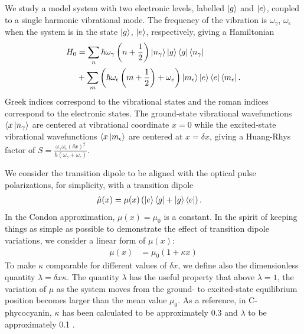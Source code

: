 We study a model system with two electronic levels, labelled $\ket{g}$ and $\ket{e}$, coupled to a single harmonic vibrational mode. The frequency of the vibration is $\omega_\gamma$, $\omega_\epsilon$ when the system is in the state $\ket{g}$, $\ket{e}$, respectively, giving a Hamiltonian
\begin{align}
	H_0 &=  \sum_n \hbar \omega_{\gamma}  \left(n + \frac{1}{2} \right)  \ket{n_{\gamma}}\ket{g}\bra{g} \bra{n_{\gamma}} \\
   &+ \sum_m \left(  \hbar \omega_{\epsilon}  \left(m + \frac{1}{2} \right) + \omega_e \right)  \ket{m_{\epsilon}} \ket{e}\bra{e} \bra{m_{\epsilon}}.
\end{align}
Greek indices correspond to the vibrational states and the roman indices correspond to the electronic states.  The ground-state vibrational wavefunctions $\langle x \ket{n_\gamma}$ are centered at vibrational coordinate $x=0$ while the excited-state vibrational wavefunctions $\langle x \ket{m_\epsilon}$ are centered at $x=\delta x$, giving a Huang-Rhys factor of $S=\frac{\omega_\gamma \omega_\epsilon(\delta x)^2}{\hbar (\omega_\gamma+\omega_\epsilon)}$.

We consider the transition dipole to be aligned with the optical pulse polarizations, for simplicity, with a transition dipole
\begin{align}
	\hat{\mu}(x) &= \mu (x)  \left( \ket{e}\bra{g} + \ket{g} \bra{e} \right).
\end{align}
In the Condon approximation, $\mu(x)=\mu_0$ is a constant. In the spirit of keeping things as simple as possible to demonstrate the effect of transition dipole variations, we consider a linear form of $\mu(x)$:
\begin{align}
	\mu(x) &= \mu_0\left( 1 +  \kappa x \right)
\end{align}
To make $\kappa$ comparable for different values of $\delta x$, we define also the dimensionless quantity $\lambda=\delta x \kappa$.
The quantity $\lambda$ has the useful property that above $\lambda=1$, the variation of $\mu$ as the system moves from the ground- to excited-state equilibrium position becomes larger than the mean value $\mu_0$.  As a reference, in C-phycocyanin, $\kappa$ has been calculated to be approximately 0.3 and $\lambda$ to be approximately 0.1 \cite{photosyntheticKappa}.



